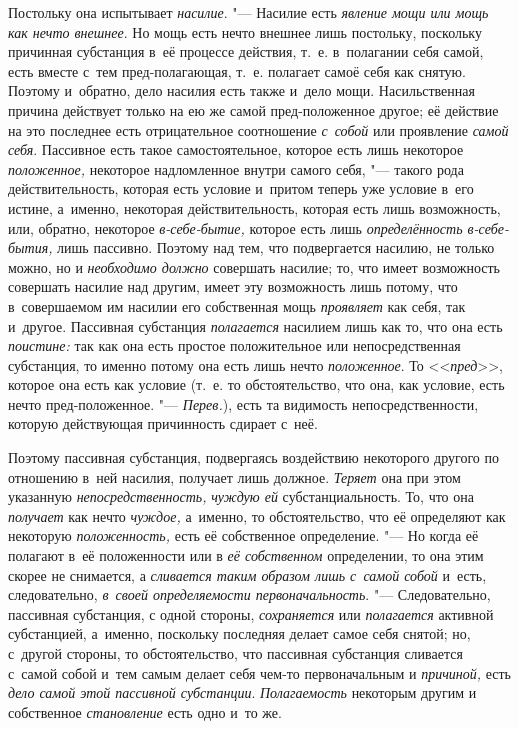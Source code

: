 Постольку она испытывает {\em насилие}. "--- Насилие есть
{\em явление мощи или мощь как нечто внешнее}. Но мощь
есть нечто внешнее лишь постольку, поскольку причинная субстанция в~её
процессе действия, т.~е. в~полагании себя самой, есть вместе с~тем
пред-полагающая, т.~е. полагает самоё себя как снятую. Поэтому и~обратно,
дело насилия есть также и~дело мощи. Насильственная причина действует
только на ею же самой пред-положенное другое; её действие на это последнее
есть отрицательное соотношение {\em с~собой} или
проявление {\em самой себя}. Пассивное есть такое
самостоятельное, которое есть лишь некоторое
{\em положенное,} некоторое надломленное внутри самого
себя, "--- такого рода действительность, которая есть условие и~притом теперь
уже условие в~его истине, а~именно, некоторая действительность, которая
есть лишь возможность, или, обратно, некоторое
{\em в-себе-бытие,} которое есть лишь
{\em определённость в-себе-бытия,} лишь пассивно.
Поэтому над тем, что подвергается насилию, не только можно, но и
{\em необходимо должно} совершать насилие; то, что
имеет возможность совершать насилие над другим, имеет эту возможность лишь
потому, что в~совершаемом им насилии его собственная мощь
{\em проявляет} как себя, так и~другое. Пассивная
субстанция {\em полагается} насилием лишь как то, что
она есть {\em поистине:} так как она есть простое
положительное или непосредственная субстанция, то именно потому она есть
лишь нечто {\em положенное}. То <<{\em пред}>>, которое она есть как условие
(т.~е. то обстоятельство, что она, как условие, есть нечто
пред-положенное. "--- {\em Перев.}), есть та видимость непосредственности,
которую действующая причинность сдирает с~неё.

Поэтому пассивная субстанция, подвергаясь воздействию некоторого другого по
отношению в~ней насилия, получает лишь должное.
{\em Теряет} она при этом указанную {\em непосредственность,}
{\em чуждую ей} субстанциальность. То, что она {\em получает} как нечто
{\em чуждое,} а~именно, то обстоятельство, что её
определяют как некоторую {\em положенность,} есть её
собственное определение. "--- Но когда её полагают в~её положенности или в
{\em её собственном} определении, то она этим скорее не
снимается, а {\em сливается таким образом лишь с~самой
собой} и~есть, следовательно, {\em в~своей
определяемости первоначальность}. "--- Следовательно, пассивная субстанция, с
одной стороны, {\em сохраняется} или
{\em полагается} активной субстанцией, а~именно,
поскольку последняя делает самое себя снятой; но, с~другой стороны, то
обстоятельство, что пассивная субстанция сливается с~самой собой и~тем
самым делает себя чем-то первоначальным и {\em причиной,} есть {\em дело
самой этой пассивной субстанции}. {\em Полагаемость} некоторым другим и
собственное {\em становление} есть одно и~то же.

